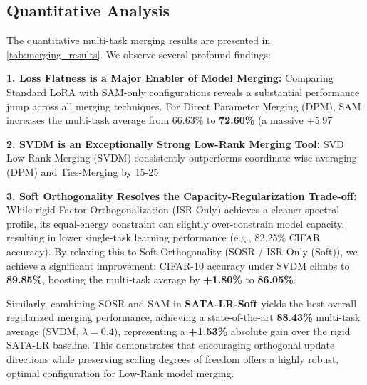 \documentclass{article}
\begin{document}
\subsection{Quantitative Analysis}
The quantitative multi-task merging results are presented in \cref{tab:merging_results}. We observe several profound findings:

\textbf{1. Loss Flatness is a Major Enabler of Model Merging:}
Comparing Standard LoRA with SAM-only configurations reveals a substantial performance jump across all merging techniques. For Direct Parameter Merging (DPM), SAM increases the multi-task average from 66.63\% to \textbf{72.60\%} (a massive +5.97%

\textbf{2. SVDM is an Exceptionally Strong Low-Rank Merging Tool:}
SVD Low-Rank Merging (SVDM) consistently outperforms coordinate-wise averaging (DPM) and Ties-Merging by 15-25%

\textbf{3. Soft Orthogonality Resolves the Capacity-Regularization Trade-off:}
While rigid Factor Orthogonalization (ISR Only) achieves a cleaner spectral profile, its equal-energy constraint can slightly over-constrain model capacity, resulting in lower single-task learning performance (e.g., 82.25\% CIFAR accuracy). By relaxing this to Soft Orthogonality (SOSR / ISR Only (Soft)), we achieve a significant improvement: CIFAR-10 accuracy under SVDM climbs to \textbf{89.85\%}, boosting the multi-task average by \textbf{+1.80\%} to \textbf{86.05\%}. 

Similarly, combining SOSR and SAM in \textbf{SATA-LR-Soft} yields the best overall regularized merging performance, achieving a state-of-the-art \textbf{88.43\%} multi-task average (SVDM, $\lambda=0.4$), representing a \textbf{+1.53\%} absolute gain over the rigid SATA-LR baseline. This demonstrates that encouraging orthogonal update directions while preserving scaling degrees of freedom offers a highly robust, optimal configuration for Low-Rank model merging.
\end{document}
